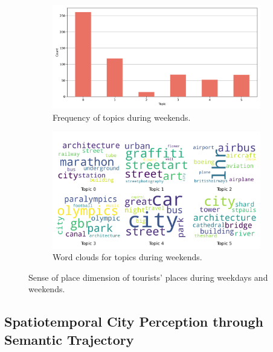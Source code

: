 \documentclass{article}
\theoremstyle{definition}
\theoremstyle{remark}
\begin{document}
\begin{figure}[!h]
    \begin{subfigure}{0.45\textwidth}
        \centering
        \includegraphics[width=\linewidth]{figures/places_sense_weekend_tourists.png}
        \caption{Frequency of topics during weekends.}
        \label{fig:places_sense_weekdend_tourists}
    \end{subfigure}
    \hfill
    \begin{subfigure}{0.5\textwidth}
        \centering
        \includegraphics[width=\linewidth]{figures/topics_weekend_tourists.png}
        \caption{Word clouds for topics during weekends.}
        \label{fig:topics_weekend_tourists}
    \end{subfigure}

    \caption{Sense of place dimension of tourists' places during weekdays and weekends.}
    \label{fig:places_topics_sense_tourists_week}
\end{figure}

\subsection{Spatiotemporal City Perception through Semantic Trajectory}
\end{document}
